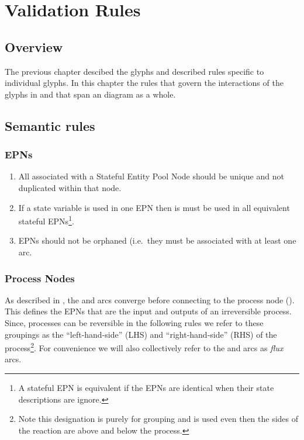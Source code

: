 \chapter{Validation Rules}
\label{chp:grammar}

\section{Overview}

The previous chapter descibed the glyphs and described rules specific
to individual glyphs. In this chapter the rules that govern the interactions of the glyphs
in \SBGNPDLone and that span an \PD diagram as a whole.

\section{Semantic rules}

\subsection{EPNs}

 \begin{enumerate}
   \item All  associated with a Stateful Entity Pool Node should be unique and not duplicated within that node.
   \item If a state variable is used in one EPN then is must be used in all equivalent stateful EPNs\footnote{A stateful EPN is equivalent if the EPNs are identical when their state descriptions are ignore.}.
   \item EPNs should not be orphaned (i.e.\, they must be associated with at least one arc.
 \end{enumerate}

\subsection{Process Nodes}

As described in , the  and  arcs converge before connecting to the process node (). This defines the EPNs that are the input and outputs of an irreversible process. Since, processes can be reversible in the following rules we refer to these groupings as the ``left-hand-side'' (LHS) and ``right-hand-side'' (RHS) of the process\footnote{Note this designation is purely for grouping and is used even then the sides of the reaction are above and below the process.}. For convenience we will also collectively refer to the  and  arcs as \emph{flux} arcs.

